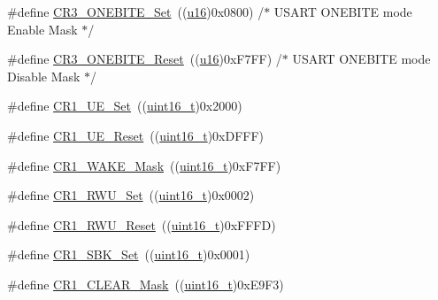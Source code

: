 \begin{DoxyCompactItemize}
\item 
\#define \hyperlink{group___u_s_a_r_t___private___defines_gac512024dda541435acfe0b50de925105}{C\+R3\+\_\+\+O\+N\+E\+B\+I\+T\+E\+\_\+\+Set}~((\hyperlink{agilefox_2library_2inc_2stm32f10x__type_8h_a9e6c91d77e24643b888dbd1a1a590054}{u16})0x0800)  /$\ast$ U\+S\+A\+R\+T O\+N\+E\+B\+I\+T\+E mode Enable Mask $\ast$/
\item 
\#define \hyperlink{group___u_s_a_r_t___private___defines_ga55dc289819dde550630df98267bbef52}{C\+R3\+\_\+\+O\+N\+E\+B\+I\+T\+E\+\_\+\+Reset}~((\hyperlink{agilefox_2library_2inc_2stm32f10x__type_8h_a9e6c91d77e24643b888dbd1a1a590054}{u16})0x\+F7\+F\+F)  /$\ast$ U\+S\+A\+R\+T O\+N\+E\+B\+I\+T\+E mode Disable Mask $\ast$/
\item 
\#define \hyperlink{group___u_s_a_r_t___private___defines_ga95f5821be56b1a5dbfdd38fdb37ed54c}{C\+R1\+\_\+\+U\+E\+\_\+\+Set}~((\hyperlink{_p_e___types_8h_a1f1825b69244eb3ad2c7165ddc99c956}{uint16\+\_\+t})0x2000)
\item 
\#define \hyperlink{group___u_s_a_r_t___private___defines_ga9c75a44192cb3dbbbf509cddfc47481c}{C\+R1\+\_\+\+U\+E\+\_\+\+Reset}~((\hyperlink{_p_e___types_8h_a1f1825b69244eb3ad2c7165ddc99c956}{uint16\+\_\+t})0x\+D\+F\+F\+F)
\item 
\#define \hyperlink{group___u_s_a_r_t___private___defines_gae4045dea092c3cbfe07d14fef39195ce}{C\+R1\+\_\+\+W\+A\+K\+E\+\_\+\+Mask}~((\hyperlink{_p_e___types_8h_a1f1825b69244eb3ad2c7165ddc99c956}{uint16\+\_\+t})0x\+F7\+F\+F)
\item 
\#define \hyperlink{group___u_s_a_r_t___private___defines_ga5cb566b7c5e126e5ef11dd25bba50ffa}{C\+R1\+\_\+\+R\+W\+U\+\_\+\+Set}~((\hyperlink{_p_e___types_8h_a1f1825b69244eb3ad2c7165ddc99c956}{uint16\+\_\+t})0x0002)
\item 
\#define \hyperlink{group___u_s_a_r_t___private___defines_ga064a46d19ffffddd410e969798d335ee}{C\+R1\+\_\+\+R\+W\+U\+\_\+\+Reset}~((\hyperlink{_p_e___types_8h_a1f1825b69244eb3ad2c7165ddc99c956}{uint16\+\_\+t})0x\+F\+F\+F\+D)
\item 
\#define \hyperlink{group___u_s_a_r_t___private___defines_ga2813b7fa1263aecfeefa48f8a55938b9}{C\+R1\+\_\+\+S\+B\+K\+\_\+\+Set}~((\hyperlink{_p_e___types_8h_a1f1825b69244eb3ad2c7165ddc99c956}{uint16\+\_\+t})0x0001)
\item 
\#define \hyperlink{group___u_s_a_r_t___private___defines_ga67f7dd35ea3d1296677e5fc50b88fa90}{C\+R1\+\_\+\+C\+L\+E\+A\+R\+\_\+\+Mask}~((\hyperlink{_p_e___types_8h_a1f1825b69244eb3ad2c7165ddc99c956}{uint16\+\_\+t})0x\+E9\+F3)
\item 

\end{DoxyCompactItemize}

